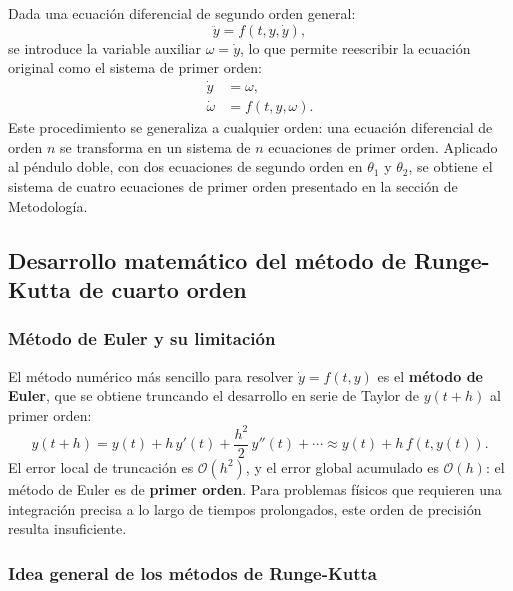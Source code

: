 \documentclass[10pt,onecolumn]{article}
\begin{document}
Dada una ecuación diferencial de segundo orden general:
\begin{equation}
    \ddot{y} = f(t, y, \dot{y}),
\end{equation}
se introduce la variable auxiliar $\omega = \dot{y}$, lo que permite reescribir la ecuación original como el sistema de primer orden:
\begin{align}
    \dot{y} &= \omega, \\
    \dot{\omega} &= f(t, y, \omega).
\end{align}
Este procedimiento se generaliza a cualquier orden: una ecuación diferencial de orden $n$ se transforma en un sistema de $n$ ecuaciones de primer orden. Aplicado al péndulo doble, con dos ecuaciones de segundo orden en $\theta_1$ y $\theta_2$, se obtiene el sistema de cuatro ecuaciones de primer orden presentado en la sección de Metodología.

\subsection{Desarrollo matemático del método de Runge-Kutta de cuarto orden}

\subsubsection*{Método de Euler y su limitación}

El método numérico más sencillo para resolver $\dot{y} = f(t,y)$ es el \textbf{método de Euler}, que se obtiene truncando el desarrollo en serie de Taylor de $y(t+h)$ al primer orden:
\begin{equation}
    y(t+h) = y(t) + h\,y'(t) + \frac{h^2}{2}\,y''(t) + \cdots \approx y(t) + h\,f(t,y(t)).
\end{equation}
El error local de truncación es $\mathcal{O}(h^2)$, y el error global acumulado es $\mathcal{O}(h)$: el método de Euler es de \textbf{primer orden}. Para problemas físicos que requieren una integración precisa a lo largo de tiempos prolongados, este orden de precisión resulta insuficiente.

\subsubsection*{Idea general de los métodos de Runge-Kutta}
\end{document}
